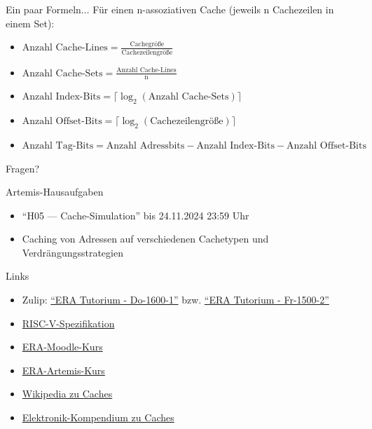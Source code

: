 \begin{frame}[c, fragile]{Ein paar Formeln$\ldots$}
	Für einen n-assoziativen Cache (jeweils n Cachezeilen in einem Set):
	\vspace{0.25cm}
	\begin{itemize}
		\item $\textrm{Anzahl Cache-Lines}=\frac{\textrm{Cachegröße}}{\textrm{Cachezeilengröße}}$
		\item $\textrm{Anzahl Cache-Sets}=\frac{\textrm{Anzahl Cache-Lines}}{\textrm{n}}$
		\item $\textrm{Anzahl Index-Bits}=\lceil\log_2(\textrm{Anzahl Cache-Sets})\rceil$
		\item $\textrm{Anzahl Offset-Bits}=\lceil\log_2(\textrm{Cachezeilengröße})\rceil$
		\item $\textrm{Anzahl Tag-Bits}= \textrm{Anzahl Adressbits} - \textrm{Anzahl Index-Bits} - \textrm{Anzahl Offset-Bits}$
	\end{itemize}
\end{frame}
\begin{frame}[c, fragile]{}{}
	\begin{center}
		\LARGE Fragen?
	\end{center}
\end{frame}

\begin{frame}[c, fragile]{Artemis-Hausaufgaben}{}
	\begin{itemize}
		\item \enquote{H05 --- Cache-Simulation} bis 24.11.2024 23:59 Uhr
		\item Caching von Adressen auf verschiedenen Cachetypen und Verdrängungsstrategien
	\end{itemize}
\end{frame}

\begin{frame}[c, fragile]{Links}{}
	\begin{itemize}
		\item Zulip: \href{https://zulip.in.tum.de/#narrow/stream/2661-ERA-Tutorium---Do-1600-1}{\enquote{ERA Tutorium - Do-1600-1}}
		      bzw. \href{https://zulip.in.tum.de/#narrow/stream/2675-ERA-Tutorium---Fr-1500-2 }{\enquote{ERA Tutorium - Fr-1500-2}}
		\item \href{https://riscv.org/wp-content/uploads/2017/05/riscv-spec-v2.2.pdf}{RISC-V-Spezifikation}
		\item \href{https://www.moodle.tum.de/course/view.php?id=100633}{ERA-Moodle-Kurs}
		\item \href{https://artemis.in.tum.de/courses/401}{ERA-Artemis-Kurs}
		\item \href{https://en.wikipedia.org/wiki/Cache_placement_policies}{Wikipedia zu Caches}
		\item \href{https://www.elektronik-kompendium.de/sites/com/0309291.htm}{Elektronik-Kompendium zu Caches}
	\end{itemize}
\end{frame}

\maketitle


